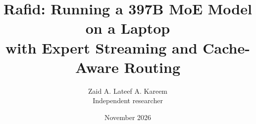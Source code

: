 \documentclass[11pt]{article}
\title{Rafid: Running a 397B MoE Model on a Laptop\\with Expert Streaming and Cache-Aware Routing}
\author{Zaid A. Lateef A. Kareem\\[2pt]\normalsize Independent researcher}
\date{November 2026}
\begin{document}
\maketitle

\begin{abstract}

\end{abstract}



\end{document}
